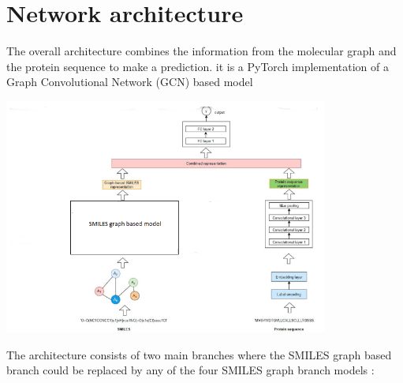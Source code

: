 \documentclass[11pt, a4paper]{article}
\begin{document}
\section{Network architecture}
    The overall architecture combines the information from the molecular graph and the protein sequence to make a prediction. it is a PyTorch implementation of a Graph Convolutional Network (GCN) based model

    \begin{center}
        \includegraphics[width=0.8\textwidth]{architecture.PNG}
    \end{center}

    The architecture consists of two main branches where the SMILES graph based branch could be replaced by any of the four SMILES graph branch models :
\end{document}
